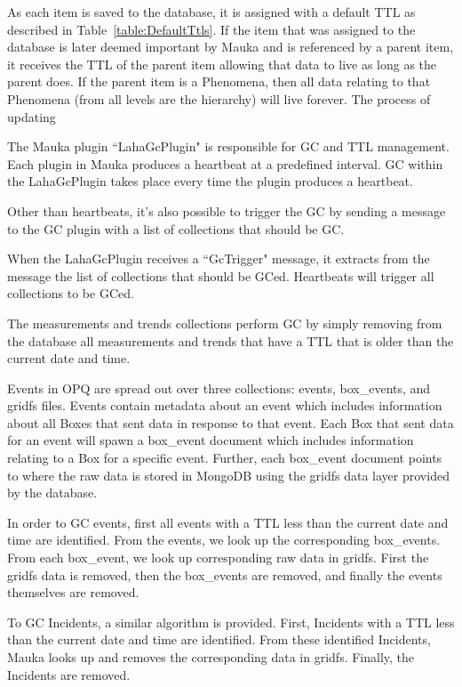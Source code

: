 As each item is saved to the database, it is assigned with a default TTL as described in Table~\ref{table:DefaultTtls}. If the item that was assigned to the database is later deemed important by Mauka and is referenced by a parent item, it receives the TTL of the parent item allowing that data to live as long as the parent does. If the parent item is a Phenomena, then all data relating to that Phenomena (from all levels are the hierarchy) will live forever. The process of updating

The Mauka plugin ``LahaGcPlugin" is responsible for GC and TTL management. Each plugin in Mauka produces a heartbeat at a predefined interval. GC within the LahaGcPlugin takes place every time the plugin produces a heartbeat.

Other than heartbeats, it's also possible to trigger the GC by sending a message to the GC plugin with a list of collections that should be GC\@.

When the LahaGcPlugin receives a ``GcTrigger" message, it extracts from the message the list of collections that should be GCed. Heartbeats will trigger all collections to be GCed.

The measurements and trends collections perform GC by simply removing from the database all measurements and trends that have a TTL that is older than the current date and time.

Events in OPQ are spread out over three collections: events, box\_events, and gridfs files. Events contain metadata about an event which includes information about all Boxes that sent data in response to that event. Each Box that sent data for an event will spawn a box\_event document which includes information relating to a Box for a specific event. Further, each box\_event document points to where the raw data is stored in MongoDB using the gridfs data layer provided by the database.

In order to GC events, first all events with a TTL less than the current date and time are identified. From the events, we look up the corresponding box\_events. From each box\_event, we look up corresponding raw data in gridfs. First the gridfs data is removed, then the box\_events are removed, and finally the events themselves are removed.

To GC Incidents, a similar algorithm is provided. First, Incidents with a TTL less than the current date and time are identified. From these identified Incidents, Mauka looks up and removes the corresponding data in gridfs. Finally, the Incidents are removed.


